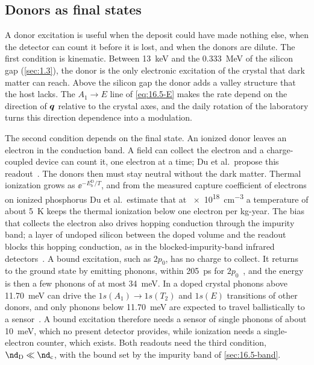 \subsection{Donors as final states}\label{sec:16.5-final}

A donor excitation is useful when the deposit could have made nothing else, when the detector can count it before it is lost, and when the donors are dilute. The first condition is kinematic. Between \SI{13}{keV} and the \SI{0.333}{MeV} of the silicon gap (\cref{sec:1.3}), the donor is the only electronic excitation of the crystal that dark matter can reach. Above the silicon gap the donor adds a valley structure that the host lacks. The $A_1 \to E$ line of \cref{eq:16.5-E} makes the rate depend on the direction of $\bm{q}$ relative to the crystal axes, and the daily rotation of the laboratory turns this direction dependence into a modulation.

The second condition depends on the final state. An ionized donor leaves an electron in the conduction band. A field can collect the electron and a charge-coupled device can count it, one electron at a time; Du et al.\ propose this readout~\cite[Sect.~VII.1]{du2022doped}. The donors then must stay neutral without the dark matter. Thermal ionization grows as $\ee^{-E_{\mathrm{b}}^{\mathrm{D}}/T}$, and from the measured capture coefficient of electrons on ionized phosphorus Du et al.\ estimate that at \SI{e18}{cm^{-3}} a temperature of about \SI{5}{K} keeps the thermal ionization below one electron per kg-year. The bias that collects the electron also drives hopping conduction through the impurity band; a layer of undoped silicon between the doped volume and the readout blocks this hopping conduction, as in the blocked-impurity-band infrared detectors~\cite[Sect.~VII.1]{du2022doped}. A bound excitation, such as $2p_0$, has no charge to collect. It returns to the ground state by emitting phonons, within \SI{205}{ps} for $2p_0$~\cite[p.~5]{vinh2008silicon}, and the energy is then a few phonons of at most \SI{34}{meV}. In a doped crystal phonons above \SI{11.70}{meV} can drive the $1s(A_1) \to 1s(T_2)$ and $1s(E)$ transitions of other donors, and only phonons below \SI{11.70}{meV} are expected to travel ballistically to a sensor~\cite[Sect.~VII.6]{du2022doped}. A bound excitation therefore needs a sensor of single phonons of about \SI{10}{meV}, which no present detector provides, while ionization needs a single-electron counter, which exists. Both readouts need the third condition, $\nd_{\mathrm{D}} \ll \nd_{\mathrm{c}}$, with the bound set by the impurity band of \cref{sec:16.5-band}.
